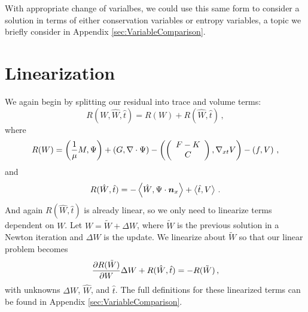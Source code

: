 \documentclass[Dissertation.tex]{subfiles}
\begin{document}
With appropriate change of varialbes, we could use this same form to consider a solution in terms
of either conservation variables or entropy variables, 
a topic we briefly consider in Appendix \ref{sec:VariableComparison}.


\section{Linearization}
We again begin by splitting our residual into trace and volume terms:
\[
R(W,\hat W,\hat t) = R(W) + R(\hat W,\hat t)\,,
\]
where
\[
R(W)=
\left( \frac{1}{\mu}M,\Psi \right)+\left( G,\nabla\cdot\Psi \right)
-\left( \left( \begin{array}{c} F-K\\ C\\ \end{array} \right),\nabla_{xt} V \right)-\left( f,V \right)\,,
\]
and
\[
R(\hat W,\hat t)=
-\left\langle \hat W,\Psi\cdot\boldsymbol n_x \right\rangle
+\left\langle \hat t,V \right\rangle\,.
\]
And again $R(\hat W,\hat t)$ is already linear, so we only need to linearize terms dependent on $W$.
Let $W=\tilde W+\Delta W$, where $\tilde W$ is the previous solution in a Newton iteration and 
$\Delta W$ is the update. We linearize about $\tilde W$ so that our linear problem becomes
\[
\frac{\partial R(\tilde W)}{\partial W}\Delta W+R(\hat W,\hat t)=-R(\tilde W)\,,
\]
with unknowns $\Delta W$, $\hat W$, and $\hat t$.
The full definitions for these linearized terms can be found in Appendix \ref{sec:VariableComparison}.
\end{document}
